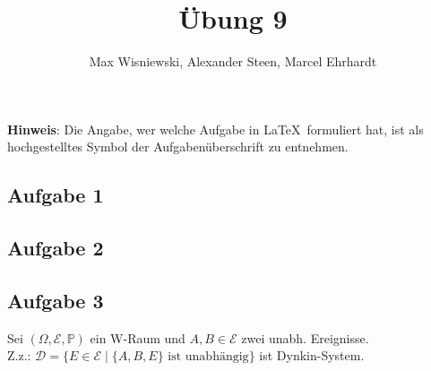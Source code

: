 \documentclass[11pt,a4paper,ngerman]{article}
\date{}
\title{Übung 9}
\author{Max Wisniewski\maxw, Alexander Steen\alex, Marcel Ehrhardt\marcel}
\newcommand{\set}[1]{ \{ #1 \}}
\newcommand{\Prob}{\mathbb{P}}
\newcommand{\Epsilon}{\mathcal{E}}
\begin{document}

\renewcommand{\figurename}{Figure}

\maketitle
\thispagestyle{fancy}

\begin{center}
\textbf{Hinweis}: Die Angabe, wer welche Aufgabe in \LaTeX\ formuliert hat, ist als hochgestelltes Symbol der Aufgabenüberschrift zu entnehmen.
\end{center}


\subsection*{Aufgabe 1}

\subsection*{Aufgabe 2}
\subsection*{Aufgabe 3}
\newcommand{\D}{\mathcal{D}}
Sei $(\Omega, \Epsilon, \Prob)$ ein W-Raum und $A,B \in \Epsilon$ zwei unabh. Ereignisse. \\
Z.z.: $\mathcal{D} = \set{E \in \Epsilon \; | \; \set{A,B, E} \text{ ist unabhängig}}$ ist Dynkin-System. \\
\end{document}
